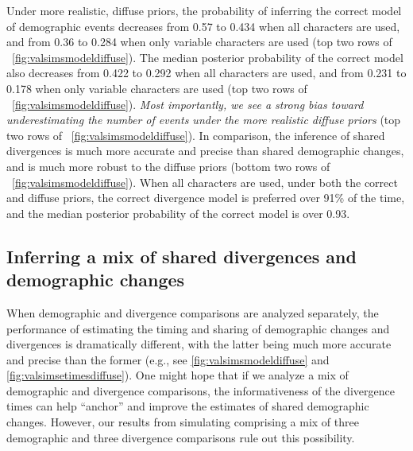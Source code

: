 Under more realistic, diffuse priors, the probability of inferring the correct
model of demographic events decreases from 0.57 to 0.434 when all characters
are used, and from 0.36 to 0.284 when only variable characters are used
(top two rows of \fig{}~\ref{fig:valsimsmodeldiffuse}).
The median posterior probability of the correct model also decreases from
0.422 to 0.292 when all characters are used,
and from 0.231 to 0.178 when only variable characters are used
(top two rows of \fig{}~\ref{fig:valsimsmodeldiffuse}).
\emph{Most importantly, we see a strong bias toward underestimating the number
    of events under the more realistic diffuse priors}
(top two rows of \fig{}~\ref{fig:valsimsmodeldiffuse}).
In comparison, the inference of shared divergences is much more accurate and
precise than shared demographic changes, and is much more robust to the diffuse
priors
(bottom two rows of \fig{}~\ref{fig:valsimsmodeldiffuse}).
When all characters are used, under both the correct and diffuse
priors, the correct divergence model is preferred over 91\% of the time,
and the median posterior probability of the correct model is over
0.93.

\ifembed{

}{}


\subsection{Inferring a mix of shared divergences and demographic changes}

When demographic and divergence comparisons are analyzed separately, the
performance of estimating the timing and sharing of demographic changes and
divergences is dramatically different, with the latter being much more accurate
and precise than the former
(e.g., see
\figs
\ref{fig:valsimsmodeldiffuse}
and
\ref{fig:valsimsetimesdiffuse}).
One might hope that
if we analyze a mix of demographic and divergence comparisons,
the informativeness of the divergence times can help ``anchor'' and
improve the estimates of shared demographic changes.
However, our results from simulating \datasets comprising a mix of three
demographic and three divergence comparisons rule out this possibility.

